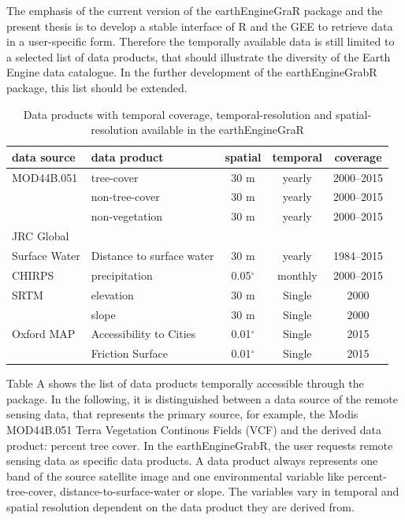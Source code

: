 The emphasis of the current version of the earthEngineGraR package and the present thesis is to develop a stable interface of R and the GEE to retrieve data in a user-specific form. Therefore the temporally available data is still limited to a selected list of data products, that should illustrate the diversity of the Earth Engine data catalogue. In the further development of the earthEngineGrabR package, this list should be extended.

\begin{table}[h]
	\begin{tabularx}{\textwidth}{llccc}
		\toprule
		\textbf{data source} & \textbf{data product} & \textbf{spatial} & \textbf{temporal} & \textbf{coverage}\\
		\toprule
		
		MOD44B.051 & tree-cover  & 30 m & yearly & 2000–2015 \\
		
		& non-tree-cover  & 30 m & yearly & 2000–2015 \\
		
		& non-vegetation  & 30 m & yearly & 2000–2015 \\
		
		JRC Global \\ Surface Water  & Distance to surface water & 30 m & yearly & 1984–2015 \\
		
		CHIRPS & precipitation & 0.05$^\circ$ & monthly & 2000–2015\\
		
		SRTM & elevation  & 30 m & Single & 2000\\
		& slope  & 30 m & Single & 2000\\
		
		Oxford MAP & Accessibility to Cities  & 0.01$^\circ$ & Single & 2015\\
		
		& Friction Surface  & 0.01$^\circ$  & Single & 2015\\
		
		\hline
	\end{tabularx}
	\caption{Data products with temporal coverage, temporal-resolution and spatial-resolution available in the earthEngineGraR}
\end{table}

Table A shows the list of data products temporally accessible through the package. In the following, it is distinguished between a data source of the remote sensing data, that represents the primary source, for example, the Modis MOD44B.051 Terra Vegetation Continous Fields (VCF) and the derived data product: percent tree cover. In the earthEngineGrabR, the user requests remote sensing data as specific data products. A data product always represents one band of the source satellite image and one environmental variable like percent-tree-cover, distance-to-surface-water or slope.
The variables vary in temporal and spatial resolution dependent on the data product they are derived from. 

